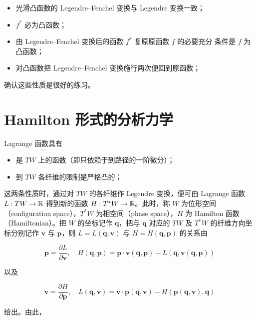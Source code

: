 \begin{itemize}
  \item 光滑凸函数的 Legendre--Fenchel 变换与 Legendre 变换一致；
  \item $f^*$ 必为凸函数；
  \item 由 Legendre--Fenchel 变换后的函数 $f^*$ 复原原函数 $f$ 的必要充分
    条件是 $f$ 为凸函数；
  \item 对凸函数把 Legendre--Fenchel 变换施行两次便回到原函数；
\end{itemize}

确认这些性质是很好的练习。


\section{Hamilton 形式的分析力学}

Lagrange 函数具有

\begin{itemize}
  \item 是 $TW$ 上的函数（即只依赖于到路径的一阶微分）；
  \item 到 $TW$ 各纤维的限制是严格凸的；
\end{itemize}

这两条性质时，通过对 $TW$ 的各纤维作 Legendre 变换，便可由 Lagrange 函数
$L:TW\to\mathbb{R}$ 得到新的函数 $H:T^*W\to\mathbb{R}$。此时，称 $W$ 为位形空间
（configuration space），$T^*W$ 为相空间（phase space），$H$ 为
Hamilton 函数（Hamiltonian）。把 $W$ 的坐标记作 $\bm{q}$，把与 $\bm{q}$
对应的 $TW$ 及 $T^*W$ 的纤维方向坐标分别记作 $\bm{v}$ 与 $\bm{p}$，则
$L=L(\bm{q},\bm{v})$ 与 $H=H(\bm{q},\bm{p})$ 的关系由

\begin{equation}
  \bm{p} = \frac{\partial L}{\partial\bm{v}},\quad
  H(\bm{q},\bm{p}) = \bm{p}\cdot\bm{v}(\bm{q},\bm{p})
    - L(\bm{q},\bm{v}(\bm{q},\bm{p}))
  \tag{2.5.1}
\end{equation}

以及

\begin{equation}
  \bm{v} = \frac{\partial H}{\partial\bm{p}},\quad
  L(\bm{q},\bm{v}) = \bm{v}\cdot\bm{p}(\bm{q},\bm{v})
    - H(\bm{p}(\bm{q},\bm{v}),\bm{q})
  \tag{2.5.2}
\end{equation}

给出。由此，

